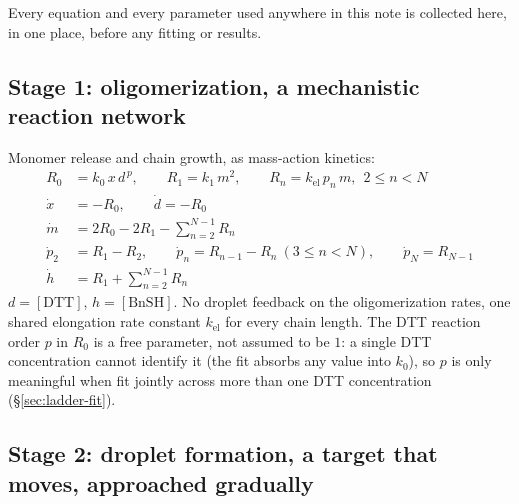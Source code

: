 \documentclass[11pt]{article}
\begin{document}
Every equation and every parameter used anywhere in this note is collected here, in one
place, before any fitting or results.

\subsection{Stage 1: oligomerization, a mechanistic reaction network}
\label{sec:model-oligo}

Monomer release and chain growth, as mass-action kinetics:
\begin{align}
R_0 &= k_0\,x\,d^{\,p}, \qquad R_1 = k_1\,m^2, \qquad R_n = k_{\mathrm{el}}\,p_n\,m,\ \ 2\le n<N
\label{eq:rates}\\
\dot x &= -R_0, \qquad \dot d = -R_0 \label{eq:xd}\\
\dot m &= 2R_0 - 2R_1 - \textstyle\sum_{n=2}^{N-1} R_n \label{eq:dm}\\
\dot p_2 &= R_1 - R_2, \qquad \dot p_n = R_{n-1}-R_n\ (3\le n<N), \qquad \dot p_N = R_{N-1}
\label{eq:dpn}\\
\dot h &= R_1 + \textstyle\sum_{n=2}^{N-1} R_n \label{eq:dh}
\end{align}
$d=[\mathrm{DTT}]$, $h=[\mathrm{BnSH}]$. No droplet feedback on the oligomerization rates, one
shared elongation rate constant $k_{\mathrm{el}}$ for every chain length. The DTT reaction
order $p$ in $R_0$ is a free parameter, not assumed to be $1$: a single DTT concentration
cannot identify it (the fit absorbs any value into $k_0$), so $p$ is only meaningful when fit
jointly across more than one DTT concentration (\S\ref{sec:ladder-fit}).

\subsection{Stage 2: droplet formation, a target that moves, approached gradually}
\label{sec:model-droplet}
\end{document}
